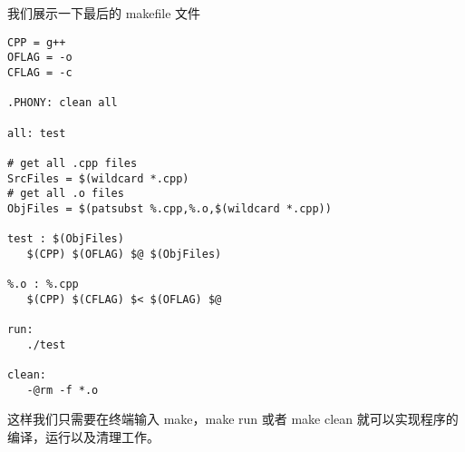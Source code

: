 我们展示一下最后的 makefile 文件
\begin{verbatim}
CPP = g++
OFLAG = -o
CFLAG = -c

.PHONY: clean all

all: test

# get all .cpp files
SrcFiles = $(wildcard *.cpp)
# get all .o files
ObjFiles = $(patsubst %.cpp,%.o,$(wildcard *.cpp))

test : $(ObjFiles)
   $(CPP) $(OFLAG) $@ $(ObjFiles)

%.o : %.cpp
   $(CPP) $(CFLAG) $< $(OFLAG) $@ 

run:
   ./test

clean:
   -@rm -f *.o
\end{verbatim}
这样我们只需要在终端输入 make，make run 或者 make clean 
就可以实现程序的编译，运行以及清理工作。






















